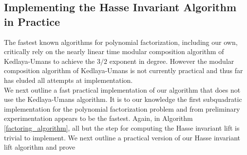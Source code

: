 \documentclass{article}
\theoremstyle{plain}
\theoremstyle{definition}
\begin{document}
\subsection{Implementing the Hasse Invariant Algorithm in Practice}
The fastest known algorithms for polynomial factorization, including our own, critically rely on the nearly linear time modular composition algorithm of Kedlaya-Umans \cite{ku} to achieve the $3/2$ exponent in degree. However the modular composition algorithm of Kedlaya-Umans is not currently practical and thus far has eluded all attempts at implementation. \\

\noindent We next outline a fast practical implementation of our algorithm that does not use the Kedlaya-Umans algorithm. It is to our knowledge the first subquadratic implementation for the polynomial factorization problem and from preliminary experimentation appears to be the fastest. Again, in Algorithm \ref{factoring_algorithm}, all but the step for computing the Hasse invariant lift is trivial to implement. We next outline a practical version of our Hasse invariant lift algorithm and prove  
\end{document}

